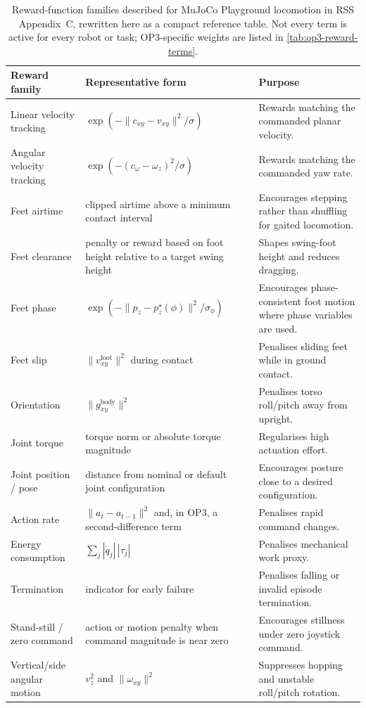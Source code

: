 \begin{table}[t]
\centering
\small
\caption{Reward-function families described for MuJoCo Playground locomotion in RSS Appendix~C, rewritten here as a compact reference table. Not every term is active for every robot or task; OP3-specific weights are listed in \cref{tab:op3-reward-terms}.}
\label{tab:playground-locomotion-reward-functions}
\begin{tabularx}{\textwidth}{p{}p{}X}
\toprule
Reward family & Representative form & Purpose \\
\midrule
Linear velocity tracking & $\exp(-\lVert c_{xy}-v_{xy}\rVert^2/\sigma)$ & Rewards matching the commanded planar velocity. \\
Angular velocity tracking & $\exp(-(c_{\omega}-\omega_z)^2/\sigma)$ & Rewards matching the commanded yaw rate. \\
Feet airtime & clipped airtime above a minimum contact interval & Encourages stepping rather than shuffling for gaited locomotion. \\
Feet clearance & penalty or reward based on foot height relative to a target swing height & Shapes swing-foot height and reduces dragging. \\
Feet phase & $\exp(-\lVert p_z-p_z^\star(\phi)\rVert^2/\sigma_{\phi})$ & Encourages phase-consistent foot motion where phase variables are used. \\
Feet slip & $\lVert v^{\mathrm{foot}}_{xy}\rVert^2$ during contact & Penalises sliding feet while in ground contact. \\
Orientation & $\lVert g^{\mathrm{body}}_{xy}\rVert^2$ & Penalises torso roll/pitch away from upright. \\
Joint torque & torque norm or absolute torque magnitude & Regularises high actuation effort. \\
Joint position / pose & distance from nominal or default joint configuration & Encourages posture close to a desired configuration. \\
Action rate & $\lVert a_t-a_{t-1}\rVert^2$ and, in OP3, a second-difference term & Penalises rapid command changes. \\
Energy consumption & $\sum_j |\dot{q}_j|\,|\tau_j|$ & Penalises mechanical work proxy. \\
Termination & indicator for early failure & Penalises falling or invalid episode termination. \\
Stand-still / zero command & action or motion penalty when command magnitude is near zero & Encourages stillness under zero joystick command. \\
Vertical/side angular motion & $v_z^2$ and $\lVert\omega_{xy}\rVert^2$ & Suppresses hopping and unstable roll/pitch rotation. \\
\bottomrule
\end{tabularx}
\end{table}

